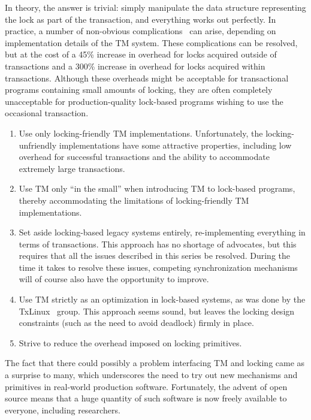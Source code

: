 In theory, the answer is trivial: simply manipulate the data structure
representing the lock as part of the transaction, and everything works
out perfectly.
In practice, a number of non-obvious complications~\cite{Volos2008TRANSACT}
can arise, depending on implementation details of the TM system.
These complications can be resolved, but at the cost of a 45\% increase in
overhead for locks acquired outside of transactions and a 300\% increase
in overhead for locks acquired within transactions.
Although these overheads might be acceptable for transactional
programs containing small amounts of locking, they are often completely
unacceptable for production-quality lock-based programs wishing to use
the occasional transaction.

\begin{enumerate}
\item	Use only locking-friendly TM implementations.
	Unfortunately, the locking-unfriendly implementations have some
	attractive properties, including low overhead for successful
	transactions and the ability to accommodate extremely large
	transactions.
\item	Use TM only ``in the small'' when introducing TM to lock-based
	programs, thereby accommodating the limitations of
	locking-friendly TM implementations.
\item	Set aside locking-based legacy systems entirely, re-implementing
	everything in terms of transactions.
	This approach has no shortage of advocates, but this requires
	that all the issues described in this series be resolved.
	During the time it takes to resolve these issues, competing
	synchronization mechanisms will of course also have the
	opportunity to improve.
\item	Use TM strictly as an optimization in lock-based systems, as was
	done by the TxLinux~\cite{ChistopherJRossbach2007a} group.
	This approach seems sound, but leaves the locking design
	constraints (such as the need to avoid deadlock) firmly in place.
\item	Strive to reduce the overhead imposed on locking primitives. 
\end{enumerate}

The fact that there could possibly a problem interfacing TM and locking
came as a surprise to many, which underscores the need to try out new
mechanisms and primitives in real-world production software.
Fortunately, the advent of open source means that a huge quantity of
such software is now freely available to everyone, including researchers.

